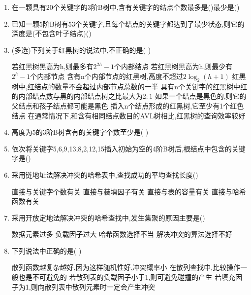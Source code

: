 \documentclass[12pt, a4paper, oneside, UTF8]{ctexbook}
\begin{document}
\begin{enumerate}
    \item 在一颗具有20个关键字的3阶B树中,含有关键字的结点个数最多是()最少是() 

    \item 已知一颗5阶B树有53个关键字,且每个结点的关键字都达到了最少状态,则它的深度是(不包含叶子结点)() 

    \item (多选)下列关于红黑树的说法中,不正确的是(   ) 
    \begin{choices}[1]
        \task 若红黑树黑高为h,则最多有$2^{2h}-1$个内部结点
        \task 若红黑树黑高为h,则最少有$2^h-1$个内部节点
        \task 含有n个内部节点的红黑树,高度不超过$2\log_2(h+1)$
        \task 红黑树中,红结点的数量不会超过内部节点总数的一半 
        \task 具有n个关键字的红黑树中红的内部结点数与黑的内部结点树之比最大为$2:1$ 
        \task 如果一个结点是黑色的,则它的父结点和孩子结点都可能是黑色 
        \task 插入n个结点形成的红黑树,它至少有1个红色结点 
        \task 在通常情况下,和含有相同结点数目的AVL树相比,红黑树的查询效率较好 
    \end{choices}

    \item \bl 高度为5的3阶B树含有的关键字个数至少是(   ) 
    
    \item 依次将关键字5,6,9,13,8,2,12,15插入初始为空的4阶B树后,根结点中包含的关键字是() 

    \item 采用链地址法解决冲突的哈希表中,查找成功的平均查找长度() 
    \begin{choices}[2]
        \task 直接与关键字个数有关 
        \task 直接与装填因子有关 
        \task 直接与表的容量有关 
        \task 直接与哈希函数有关 
    \end{choices}

    \item 采用开放定地法解决冲突的哈希查找中,发生集聚的原因主要是() 
    \begin{choices}[2]
        \task 数据元素过多
        \task 负载因子过大 
        \task 哈希函数选择不当 
        \task 解决冲突的算法选择不好 
    \end{choices}

    \item 下列说法中正确的是(  ) 
    \begin{choices}[1]
        \task 散列函数越复杂越好,因为这样随机性好,冲突概率小
        \task 在散列查找中,比较操作一般也是不可避免的 
        \task 若散列表的负载因子小于1,则可避免碰撞的产生
        \task 若填充因子为1,则向散列表中散列元素时一定会产生冲突 
    \end{choices}


\end{enumerate}
\end{document}
